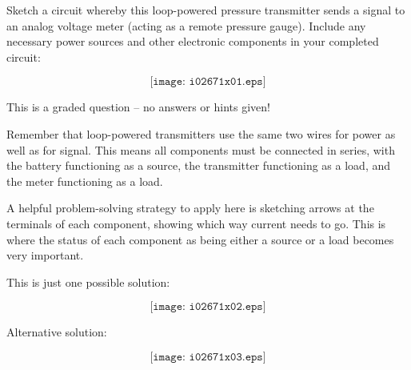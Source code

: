 

Sketch a circuit whereby this loop-powered pressure transmitter sends a signal to an analog voltage meter (acting as a remote pressure gauge).  Include any necessary power sources and other electronic components in your completed circuit:

\vskip 50pt

$$\texttt{[image: i02671x01.eps]}$$

\vfil 

\eject






This is a graded question -- no answers or hints given!







Remember that loop-powered transmitters use the same two wires for power as well as for signal.  This means all components must be connected in series, with the battery functioning as a source, the transmitter functioning as a load, and the meter functioning as a load.

\vskip 10pt

A helpful problem-solving strategy to apply here is sketching arrows at the terminals of each component, showing which way current needs to go.  This is where the status of each component as being either a source or a load becomes very important.

\vskip 10pt

This is just one possible solution:

$$\texttt{[image: i02671x02.eps]}$$

\vskip 10pt

Alternative solution:

$$\texttt{[image: i02671x03.eps]}$$




